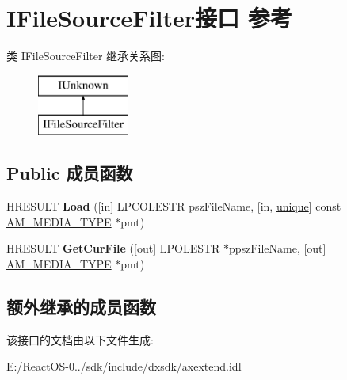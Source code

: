 \hypertarget{interface_i_file_source_filter}{}\section{I\+File\+Source\+Filter接口 参考}
\label{interface_i_file_source_filter}
类 I\+File\+Source\+Filter 继承关系图\+:\begin{figure}[H]
\begin{center}
\leavevmode
\includegraphics[height=2.000000cm]{interface_i_file_source_filter}
\end{center}
\end{figure}
\subsection*{Public 成员函数}
\begin{DoxyCompactItemize}
\item 
\mbox{\label{interface_i_file_source_filter_a0f270c5a5f194b0ee5aee75b27e45790}} 
H\+R\+E\+S\+U\+LT {\bfseries Load} (\mbox{[}in\mbox{]} L\+P\+C\+O\+L\+E\+S\+TR psz\+File\+Name, \mbox{[}in, \hyperlink{interfaceunique}{unique}\mbox{]} const \hyperlink{struct_a_m___m_e_d_i_a___t_y_p_e}{A\+M\+\_\+\+M\+E\+D\+I\+A\+\_\+\+T\+Y\+PE} $\ast$pmt)
\item 
\mbox{\label{interface_i_file_source_filter_a73525e7b466f411031e0437ebcf8ceb1}} 
H\+R\+E\+S\+U\+LT {\bfseries Get\+Cur\+File} (\mbox{[}out\mbox{]} L\+P\+O\+L\+E\+S\+TR $\ast$ppsz\+File\+Name, \mbox{[}out\mbox{]} \hyperlink{struct_a_m___m_e_d_i_a___t_y_p_e}{A\+M\+\_\+\+M\+E\+D\+I\+A\+\_\+\+T\+Y\+PE} $\ast$pmt)
\end{DoxyCompactItemize}
\subsection*{额外继承的成员函数}


该接口的文档由以下文件生成\+:\begin{DoxyCompactItemize}
\item 
E\+:/\+React\+O\+S-\/0../sdk/include/dxsdk/axextend.\+idl\end{DoxyCompactItemize}
